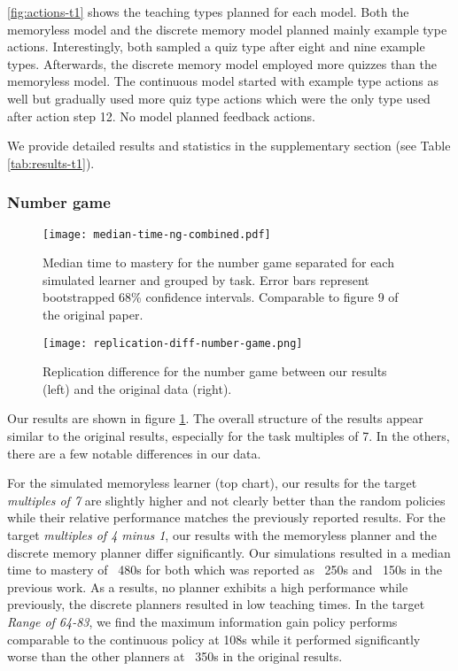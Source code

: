 \autoref{fig:actions-t1} shows the teaching types planned for each model.
Both the memoryless model and the discrete memory model planned mainly example type actions.
Interestingly, both sampled a quiz type after eight and nine example types.
Afterwards, the discrete memory model employed more quizzes than the memoryless model.
The continuous model started with example type actions as well but gradually used more quiz type actions which were the only type used after action step 12.
No model planned feedback actions.


We provide detailed results and statistics in the supplementary section (see Table \ref{tab:results-t1}).

\subsubsection{Number game}

\begin{figure}[t]
    \centering
    \texttt{[image: median-time-ng-combined.pdf]}
    \caption{Median time to mastery for the number game separated for each simulated learner and grouped by task. 
    Error bars represent bootstrapped 68\% confidence intervals. 
    Comparable to figure 9 of the original paper.}
    \label{fig:median-time-ng}
\end{figure}


\begin{figure}
    \centering
    \texttt{[image: replication-diff-number-game.png]}
    \caption{Replication difference for the number game between our results (left) and the original data (right).
    }
    \label{fig:difference-t2}
\end{figure}


Our results are shown in figure \ref{fig:median-time-ng}. 
The overall structure of the results appear similar to the original results, especially for the task multiples of 7. 
In the others, there are a few notable differences in our data. 

For the simulated memoryless learner (top chart), our results for the target \textit{multiples of 7} are slightly higher and not clearly better than the random policies while their relative performance matches the previously reported results.
For the target \textit{multiples of 4 minus 1}, our results with the memoryless planner and the discrete memory planner differ significantly. 
Our simulations resulted in a median time to mastery of ~480s for both which was reported as ~250s and ~150s in the previous work. 
As a results, no planner exhibits a high performance while previously, the discrete planners resulted in low teaching times.
In the target \textit{Range of 64-83}, we find the maximum information gain policy performs comparable to the continuous policy at 108s while it performed significantly worse than the other planners at ~350s in the original results.

